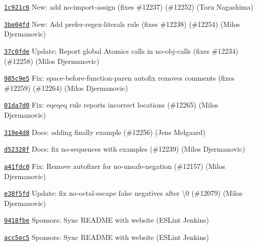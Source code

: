\begin{DoxyItemize}
\item \href{https://github.com/eslint/eslint/commit/1c921c6dfd7ddfb0308c8103e53d32c1241475f0}{\texttt{ {\ttfamily 1c921c6}}} New\+: add no-\/import-\/assign (fixes \#12237) (\#12252) (Toru Nagashima)
\item \href{https://github.com/eslint/eslint/commit/3be04fd6a4e7b3f5a5ecb845a29cf29b71fe2dfb}{\texttt{ {\ttfamily 3be04fd}}} New\+: Add prefer-\/regex-\/literals rule (fixes \#12238) (\#12254) (Milos Djermanovic)
\item \href{https://github.com/eslint/eslint/commit/37c0fdeb87b92a0b779b125adf45535b79b65757}{\texttt{ {\ttfamily 37c0fde}}} Update\+: Report global Atomics calls in no-\/obj-\/calls (fixes \#12234) (\#12258) (Milos Djermanovic)
\item \href{https://github.com/eslint/eslint/commit/985c9e5eba351965a8a1491a41dbdcc78154b8f4}{\texttt{ {\ttfamily 985c9e5}}} Fix\+: space-\/before-\/function-\/paren autofix removes comments (fixes \#12259) (\#12264) (Milos Djermanovic)
\item \href{https://github.com/eslint/eslint/commit/01da7d04c4e5a7376cf241ec02db7971726a1bf9}{\texttt{ {\ttfamily 01da7d0}}} Fix\+: eqeqeq rule reports incorrect locations (\#12265) (Milos Djermanovic)
\item \href{https://github.com/eslint/eslint/commit/319e4d8386ea846928f0f906c251b46043a53491}{\texttt{ {\ttfamily 319e4d8}}} Docs\+: adding finally example (\#12256) (Jens Melgaard)
\item \href{https://github.com/eslint/eslint/commit/d52328f012f3704c7d1ce39427e63f80531c7979}{\texttt{ {\ttfamily d52328f}}} Docs\+: fix no-\/sequences {\ttfamily with} examples (\#12239) (Milos Djermanovic)
\item \href{https://github.com/eslint/eslint/commit/a41fdc07404a7675d14183fab245fb8f49dcb858}{\texttt{ {\ttfamily a41fdc0}}} Fix\+: Remove autofixer for no-\/unsafe-\/negation (\#12157) (Milos Djermanovic)
\item \href{https://github.com/eslint/eslint/commit/e38f5fdfc786363a3eae642f1a69a8725600aa61}{\texttt{ {\ttfamily e38f5fd}}} Update\+: fix no-\/octal-\/escape false negatives after \textbackslash{}0 (\#12079) (Milos Djermanovic)
\item \href{https://github.com/eslint/eslint/commit/9418fbe0eb31cace3debe27b620709628df2fad7}{\texttt{ {\ttfamily 9418fbe}}} Sponsors\+: Sync README with website (ESLint Jenkins)
\item \href{https://github.com/eslint/eslint/commit/acc5ec5082aed466a29899f651e6767b39155aec}{\texttt{ {\ttfamily acc5ec5}}} Sponsors\+: Sync README with website (ESLint Jenkins)

\end{DoxyItemize}
